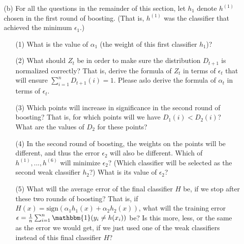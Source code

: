 \documentclass[10pt]{article}
\begin{document}
\begin{enumerate}
\begin{itemize}
		      \item[(b)] For all the questions in the remainder of this section, let $h_{1}$ denote $h^{(1)}$ chosen in the first round of boosting. (That is, $h^{(1)}$ was the classifier that achieved the minimum $\epsilon_{1}$.)
		            \begin{enumerate}
			            \item[(1)] What is the value of $\alpha_{1}$ (the weight of this first classifier $h_{1}$)? ~\\

			            \item[(2)] What should $Z_{t}$ be in order to make sure the distribution $D_{t+1}$ is normalized correctly? That is, derive the formula of $Z_{t}$ in terms of $\epsilon_{t}$ that will ensure $\sum_{i=1}^{n} D_{t+1}(i) = 1$. Please aslo derive the formula of $\alpha_{t}$ in terms of $\epsilon_{t}$. ~\\

			            \item[(3)] Which points will increase in significance in the second round of boosting? That is, for which points will we have $D_{1}(i) < D_{2}(i)$? What are the values of $D_{2}$ for these points?~\\

			            \item[(4)] In the second round of boosting, the weights on the points will be different, and thus the error $\epsilon_2$ will also be different. Which of $h^{(1)}, . . . , h^{(6)}$ will minimize $\epsilon_2$? (Which classifier will be selected as the second weak classifier $h_2$?) What is its value of $\epsilon_2$?~\\

			            \item[(5)] What will the average error of the final classifier $H$ be, if we stop after these two rounds of boosting? That is, if $H(x) = \text{sign}(\alpha_{1}h_{1}(x) + \alpha_{2}h_{2}(x))$, what will the  training error $\epsilon = \frac{1}{n} \sum_{i=1}^{n} \mathbbm{1} (y_{i} \neq h(x_{i}))$ be? Is this more, less, or the same as the error we would get, if we just used one of the weak classifiers instead of this final classifier $H$?~\\


\end{enumerate}
\end{itemize}
\end{enumerate}
\end{document}

